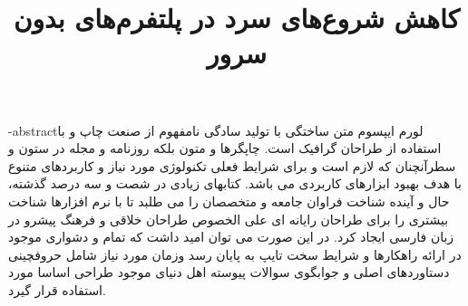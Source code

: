 \documentclass[oneside,openany,mscS]{SBU-Thesis}
\begin{document}
	\title{کاهش شروع‌های سرد در پلتفرم‌های بدون سرور}
	
	\subject{مهندسی کامپیوتر}
	
	
	


	
	

	\fa-abstract{لورم ایپسوم متن ساختگی با تولید سادگی نامفهوم از صنعت چاپ و با استفاده از طراحان گرافیک است. چاپگرها و متون بلکه روزنامه و مجله در ستون و سطرآنچنان که لازم است و برای شرایط فعلی تکنولوژی مورد نیاز و کاربردهای متنوع با هدف بهبود ابزارهای کاربردی می باشد. کتابهای زیادی در شصت و سه درصد گذشته، حال و آینده شناخت فراوان جامعه و متخصصان را می طلبد تا با نرم افزارها شناخت بیشتری را برای طراحان رایانه ای علی الخصوص طراحان خلاقی و فرهنگ پیشرو در زبان فارسی ایجاد کرد. در این صورت می توان امید داشت که تمام و دشواری موجود در ارائه راهکارها و شرایط سخت تایپ به پایان رسد وزمان مورد نیاز شامل حروفچینی دستاوردهای اصلی و جوابگوی سوالات پیوسته اهل دنیای موجود طراحی اساسا مورد استفاده قرار گیرد.	}

\firstPage
\abstractPage %


\tableofcontents %
\listoffigures \newpage %
\listoftables \newpage %







	
\newpage

\end{document}
